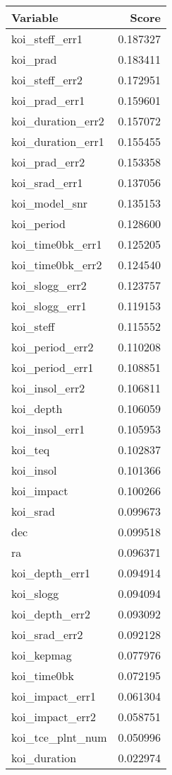 \begin{tabular}{lr}
\toprule
          Variable &     Score \\
\midrule
    koi\_steff\_err1 &  0.187327 \\
          koi\_prad &  0.183411 \\
    koi\_steff\_err2 &  0.172951 \\
     koi\_prad\_err1 &  0.159601 \\
 koi\_duration\_err2 &  0.157072 \\
 koi\_duration\_err1 &  0.155455 \\
     koi\_prad\_err2 &  0.153358 \\
     koi\_srad\_err1 &  0.137056 \\
     koi\_model\_snr &  0.135153 \\
        koi\_period &  0.128600 \\
  koi\_time0bk\_err1 &  0.125205 \\
  koi\_time0bk\_err2 &  0.124540 \\
    koi\_slogg\_err2 &  0.123757 \\
    koi\_slogg\_err1 &  0.119153 \\
         koi\_steff &  0.115552 \\
   koi\_period\_err2 &  0.110208 \\
   koi\_period\_err1 &  0.108851 \\
    koi\_insol\_err2 &  0.106811 \\
         koi\_depth &  0.106059 \\
    koi\_insol\_err1 &  0.105953 \\
           koi\_teq &  0.102837 \\
         koi\_insol &  0.101366 \\
        koi\_impact &  0.100266 \\
          koi\_srad &  0.099673 \\
               dec &  0.099518 \\
                ra &  0.096371 \\
    koi\_depth\_err1 &  0.094914 \\
         koi\_slogg &  0.094094 \\
    koi\_depth\_err2 &  0.093092 \\
     koi\_srad\_err2 &  0.092128 \\
        koi\_kepmag &  0.077976 \\
       koi\_time0bk &  0.072195 \\
   koi\_impact\_err1 &  0.061304 \\
   koi\_impact\_err2 &  0.058751 \\
  koi\_tce\_plnt\_num &  0.050996 \\
      koi\_duration &  0.022974 \\
\bottomrule
\end{tabular}
